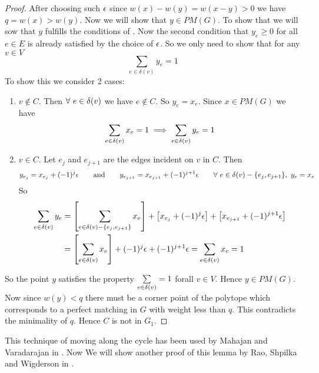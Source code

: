 \begin{proof}
	After choosing such $\epsilon$ since $w(x)-w(y)=w(x-y)>0$ we have $q=w(x)>w(y)$. Now we will show that $y\in PM(G)$. To show that we will sow that $y$ fulfills the conditions of . Now the second condition that $y_e\geq 0$ for all $e\in E$ is already satisfied by the choice of $\epsilon$. So we only need to show that for any $v\in V$ $$\sum_{e\in \delta(v)}y_e=1$$To show this we consider 2 cases:
	\begin{enumerate}[label=\bfseries Case \arabic*:,leftmargin=1.7cm]
		\item $v\notin C$. Then $\forall \ e\in \delta(v)$ we have $e\notin C$. So $y_e=x_e$. Since $x\in PM(G)$ we have $$\sum_{e\in\delta(v)}x_e=1\implies \sum_{e\in \delta(v)}y_e=1$$
		\item $v\in C$. Let $e_j$ and $e_{j+1}$ are the edges incident on $v$ in $C$. Then $$y_{e_j}=x_{e_j}+(-1)^{j}\eps\qquad \text{and}\qquad y_{e_{j+1}}=x_{e_{j+1}}+(-1)^{j+1}\eps\qquad \forall\ e\in \dl(v)-\{e_{j},e_{j+1}\},\ y_e=x_e$$So\begin{align*}
			      \sum_{e\in \delta(v)}y_e & = \left[\sum_{e\in \delta(v)-\{e_j,e_{j+1}\}}x_e\right]+\left[x_{e_j}+(-1)^j\epsilon\right]+\left[x_{e_{j+1}}+(-1)^{j+1}\epsilon\right] \\
			                            & = \left[\sum_{e\in \delta(v)}x_e\right]+(-1)^j\epsilon+(-1)^{j+1}\epsilon = \sum_{e\in \delta(v)}x_e=1
		      \end{align*}
	\end{enumerate}
	So the point $y$ satisfies the property $\sum\limits_{e\in\delta(v)}=1$ forall $v\in V$. Hence $y\in PM(G)$. Now since $w(y)<q$ there must be a corner point of the polytope which corresponds to a perfect matching in $G$ with weight less than $q$. This contradicts the minimality of $q$. Hence $C$ is not in $G_1$.
\end{proof}
This technique of moving along the cycle has been used by Mahajan and Varadarajan in \cite{MahajanVaradarajan_2000_AnN_CONF}. Now We will show another proof of this lemma by Rao, Shpilka  and Wigderson in \cite{GoldwasserGrossman_2017_BPM}.\vspace*{\baselineskip}


